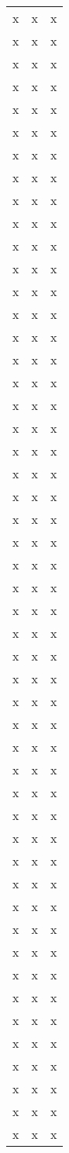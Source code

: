 \documentclass[a4paper,10pt]{scrartcl}
\begin{document}
\begin{longtable}{|l|cc|}
x & x & x\\ 
x & x & x\\ 
x & x & x\\ 
x & x & x\\ 
x & x & x\\ 
x & x & x\\ 
x & x & x\\ 
x & x & x\\ 
x & x & x\\ 
x & x & x\\ 
x & x & x\\ 
x & x & x\\ 
x & x & x\\ 
x & x & x\\ 
x & x & x\\ 
x & x & x\\ 
x & x & x\\ 
x & x & x\\ 
x & x & x\\ 
x & x & x\\ 
x & x & x\\ 
x & x & x\\ 
x & x & x\\ 
x & x & x\\ 
x & x & x\\ 
x & x & x\\ 
x & x & x\\ 
x & x & x\\ 
x & x & x\\ 
x & x & x\\ 
x & x & x\\ 
x & x & x\\ 
x & x & x\\ 
x & x & x\\ 
x & x & x\\ 
x & x & x\\ 
x & x & x\\ 
x & x & x\\ 
x & x & x\\ 
x & x & x\\ 
x & x & x\\ 
x & x & x\\ 
x & x & x\\ 
x & x & x\\ 
x & x & x\\ 
x & x & x\\ 
x & x & x\\ 
x & x & x\\ 
x & x & x\\ 
x & x & x\\ 

\end{longtable}
\end{document}
